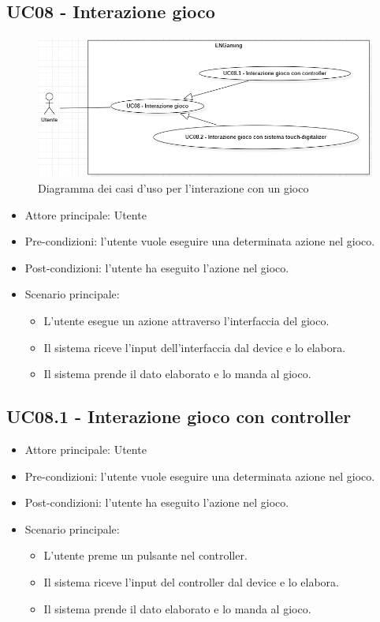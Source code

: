 \subsection{UC08 - Interazione gioco}
\begin{figure}[h]
    \centering
    \includegraphics[width=400pt]{images/usecase/UC08.png}
    \caption{Diagramma dei casi d'uso per l'interazione con un gioco}
    \label{fig:UC08}
\end{figure}
\begin{itemize}
    \item Attore principale: Utente
    \item Pre-condizioni: l'utente vuole eseguire una determinata azione nel gioco.
    \item Post-condizioni: l'utente ha eseguito l'azione nel gioco.
    \item Scenario principale: \begin{itemize}
        \item L'utente esegue un azione attraverso l'interfaccia del gioco.
        \item Il sistema riceve l'input dell'interfaccia dal device e lo elabora.
        \item Il sistema prende il dato elaborato e lo manda al gioco.
    \end{itemize}
\end{itemize}

\subsection{UC08.1 - Interazione gioco con controller}
\begin{itemize}
    \item Attore principale: Utente
    \item Pre-condizioni: l'utente vuole eseguire una determinata azione nel gioco.
    \item Post-condizioni: l'utente ha eseguito l'azione nel gioco.
    \item Scenario principale: \begin{itemize}
        \item L'utente preme un pulsante nel controller.
        \item Il sistema riceve l'input del controller dal device e lo elabora.
        \item Il sistema prende il dato elaborato e lo manda al gioco.
    \end{itemize}
\end{itemize}

